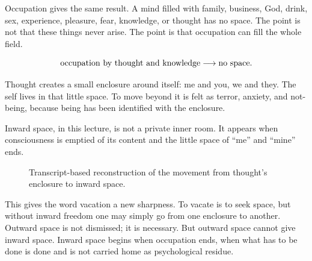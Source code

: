 \documentclass[11pt,oneside]{book}
\begin{document}
Occupation gives the same result. A mind filled with family, business, God, drink, sex, experience, pleasure, fear, knowledge, or thought has no space. The point is not that these things never arise. The point is that occupation can fill the whole field.

\begin{equation}
\hbox{occupation by thought and knowledge}
\longrightarrow
\hbox{no space}.
\end{equation}

Thought creates a small enclosure around itself: me and you, we and they. The self lives in that little space. To move beyond it is felt as terror, anxiety, and not-being, because being has been identified with the enclosure.

\begin{definition}
Inward space, in this lecture, is not a private inner room. It appears when consciousness is emptied of its content and the little space of ``me'' and ``mine'' ends.
\end{definition}

\begin{figure}
\centering
{}
\caption{Transcript-based reconstruction of the movement from thought's enclosure to inward space.}
\end{figure}

This gives the word vacation a new sharpness. To vacate is to seek space, but without inward freedom one may simply go from one enclosure to another. Outward space is not dismissed; it is necessary. But outward space cannot give inward space. Inward space begins when occupation ends, when what has to be done is done and is not carried home as psychological residue.
\end{document}
